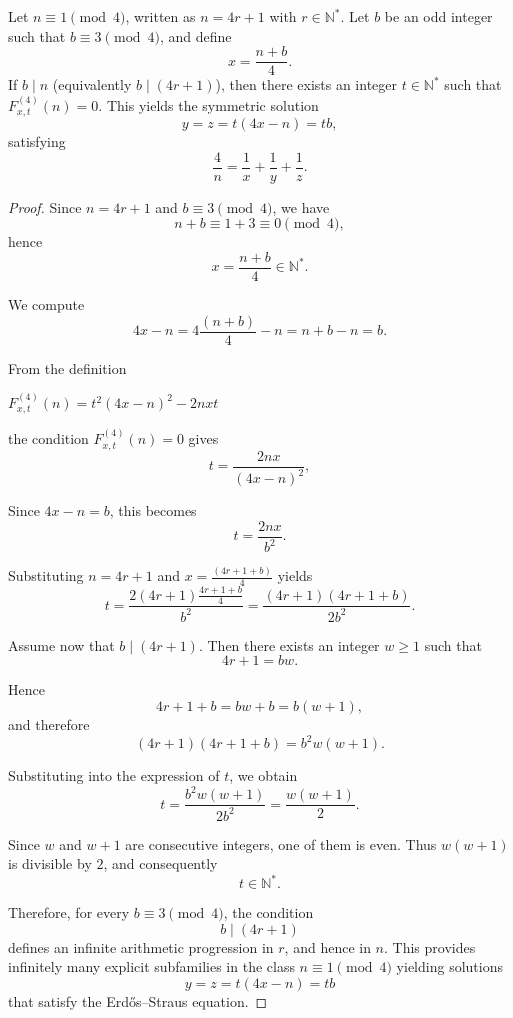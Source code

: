 \documentclass[10pt,a4paper]{amsart}
\begin{document}
  \begin{proposition}
Let \(n \equiv 1 \pmod{4}\), written as \(n = 4r + 1\) with \(r \in \mathbb{N}^*\). 
Let \(b\) be an odd integer such that \(b \equiv 3 \pmod{4}\), and define
\[
x = \frac{n+b}{4}.
\]
If \(b \mid n\) (equivalently \(b \mid (4r+1)\)), then there exists an integer \(t \in \mathbb{N}^*\) such that
\(F_{x,t}^{(4)}(n) = 0\). This yields the symmetric solution
\[
y = z = t(4x-n) = t b,
\]
satisfying
\[
\frac{4}{n} = \frac{1}{x} + \frac{1}{y} + \frac{1}{z}.
\]
\end{proposition}

\begin{proof}
Since $n = 4r+1$ and $b \equiv 3 \pmod{4}$, we have
\[
n+b \equiv 1+3 \equiv 0 \pmod{4},
\]
hence
\[
x = \frac{n+b}{4} \in \mathbb{N}^*.
\]

We compute
\[
4x-n = 4\frac{(n+b)}{4} - n = n+b-n = b .
\]

From the definition

\(F_{x,t}^{(4)}(n)=t^2(4x-n)^2 - 2nxt\)

the condition \(F_{x,t}^{(4)}(n)=0\) gives
\[
t = \frac{2nx}{(4x-n)^2}, 
\]

Since $4x-n = b$, this becomes
\[
t = \frac{2nx}{b^2}.
\]

Substituting $n=4r+1$ and $x=\frac{(4r+1+b)}{4}$ yields
\[
t
= \frac{2(4r+1)\frac{4r+1+b}{4}}{b^2}
= \frac{(4r+1)(4r+1+b)}{2b^2}.
\]

Assume now that $b \mid (4r+1)$. Then there exists an integer $w \ge 1$ such that
\[
4r+1 = bw.
\]

Hence
\[
4r+1+b = bw + b = b(w+1),
\]
and therefore
\[
(4r+1)(4r+1+b) = b^2 w(w+1).
\]

Substituting into the expression of $t$, we obtain
\[
t = \frac{b^2 w(w+1)}{2b^2}
  = \frac{w(w+1)}{2}.
\]

Since $w$ and $w+1$ are consecutive integers, one of them is even.
Thus $w(w+1)$ is divisible by $2$, and consequently
\[
t \in \mathbb{N}^*.
\]

Therefore, for every $b \equiv 3 \pmod{4}$, the condition
\[
b \mid (4r+1)
\]
defines an infinite arithmetic progression in $r$, and hence in $n$.
This provides infinitely many explicit subfamilies in the class
$n \equiv 1 \pmod{4}$ yielding solutions
\[
y = z = t(4x-n)=tb
\]
that satisfy the Erd\H{o}s--Straus equation.
\end{proof}
\end{document}
